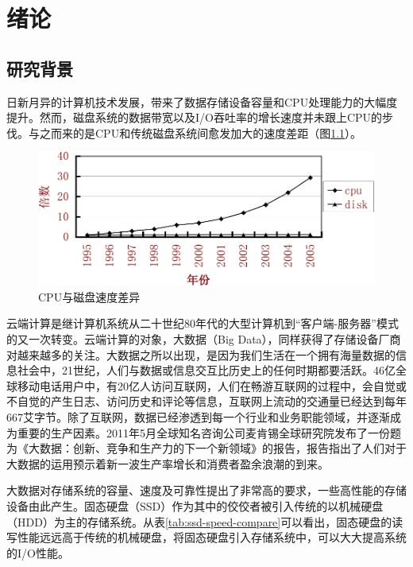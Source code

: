
\chapter{绪论}
\label{cha:introduction}

\section{研究背景}
\label{sec:background}

日新月异的计算机技术发展，带来了数据存储设备容量和CPU处理能力的大幅度提升。然而，磁盘系统的数据带宽以及I/O吞吐率的增长速度并未跟上CPU的步伐。与之而来的是CPU和传统磁盘系统间愈发加大的速度差距\cite{matthews2008intelturbomem}（图\ref{fig:cpu-disk-diff}）。

\begin{figure}[H]
\centering
\includegraphics[width=0.7\linewidth]{./graph/cpu-disk-gap}
\caption{CPU与磁盘速度差异}
\label{fig:cpu-disk-diff}
\end{figure}

云端计算\cite{jimgray2003cloud}是继计算机系统从二十世纪80年代的大型计算机到“客户端-服务器”模式的又一次转变。云端计算的对象，大数据（Big Data），同样获得了存储设备厂商对越来越多的关注。大数据之所以出现，是因为我们生活在一个拥有海量数据的信息社会中，21世纪，人们与数据或信息交互比历史上的任何时期都要活跃。46亿全球移动电话用户中，有20亿人访问互联网，人们在畅游互联网的过程中，会自觉或不自觉的产生日志、访问历史和评论等信息，互联网上流动的交通量已经达到每年667艾字节。除了互联网，数据已经渗透到每一个行业和业务职能领域，并逐渐成为重要的生产因素。2011年5月全球知名咨询公司麦肯锡全球研究院发布了一份题为《大数据：创新、竞争和生产力的下一个新领域》的报告，报告指出了人们对于大数据的运用预示着新一波生产率增长和消费者盈余浪潮的到来。

大数据对存储系统的容量、速度及可靠性提出了非常高的要求，一些高性能的存储设备由此产生。固态硬盘（SSD）作为其中的佼佼者被引入传统的以机械硬盘（HDD）为主的存储系统\cite{morris2003evostorage}。从表\ref{tab:ssd-speed-compare}可以看出，固态硬盘的读写性能远远高于传统的机械硬盘\cite{libo2010cacheforssd}，将固态硬盘引入存储系统中，可以大大提高系统的I/O性能。

